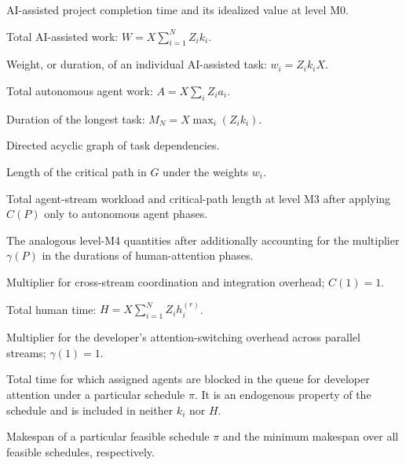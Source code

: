 \begin{description}[style=nextline]
  \item[$T_{ai}$, $T_{ai}^{(0)}$] AI-assisted project completion time and its
  idealized value at level M0.

  \item[$W$] Total AI-assisted work:
  $W=X\sum_{i=1}^{N}Z_i k_i$.

  \item[$w_i$] Weight, or duration, of an individual AI-assisted task:
  $w_i=Z_i k_i X$.

  \item[$A$] Total autonomous agent work:
  $A=X\sum_i Z_i a_i$.

  \item[$M_N$] Duration of the longest task:
  $M_N=X\max_i(Z_i k_i)$.

  \item[$G=(V,E)$] Directed acyclic graph of task dependencies.

  \item[$L$] Length of the critical path in $G$ under the weights $w_i$.

  \item[$W_3(P)$, $L_3(P)$] Total agent-stream workload and critical-path
  length at level M3 after applying $C(P)$ only to autonomous agent phases.

  \item[$W_4(P)$, $L_4(P)$] The analogous level-M4 quantities after additionally
  accounting for the multiplier $\gamma(P)$ in the durations of human-attention
  phases.

  \item[$C(P)$] Multiplier for cross-stream coordination and integration
  overhead; $C(1)=1$.

  \item[$H$] Total human time:
  $H=X\sum_{i=1}^{N}Z_i h_i^{(r)}$.

  \item[$\gamma(P)$] Multiplier for the developer's attention-switching
  overhead across parallel streams; $\gamma(1)=1$.

  \item[$Q(\pi)$] Total time for which assigned agents are blocked in the queue
  for developer attention under a particular schedule $\pi$. It is an
  endogenous property of the schedule and is included in neither $k_i$ nor
  $H$.

  \item[$T(\pi)$, $T^{*}$] Makespan of a particular feasible schedule $\pi$ and
  the minimum makespan over all feasible schedules, respectively.


\end{description}
